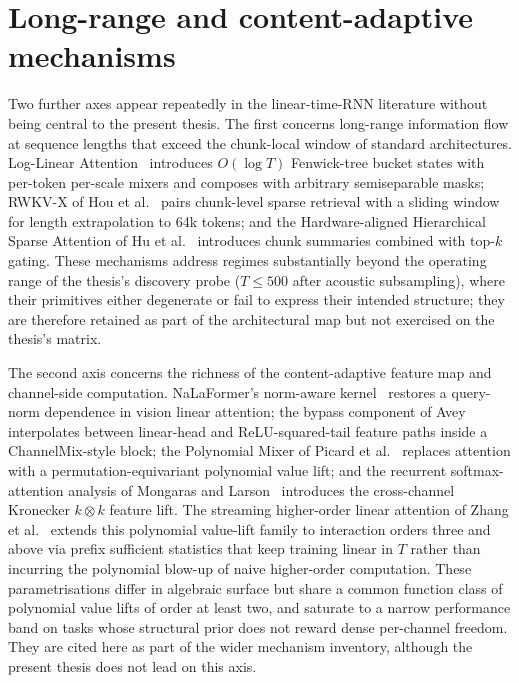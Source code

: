   \section{Long-range and content-adaptive mechanisms}

  Two further axes appear repeatedly in the linear-time-RNN
  literature without being central to the present thesis. The first
  concerns long-range information flow at sequence lengths that
  exceed the chunk-local window of standard architectures.
  Log-Linear Attention~\cite{guo2025loglinear} introduces
  $O(\log T)$ Fenwick-tree bucket states with per-token per-scale
  mixers and composes with arbitrary semiseparable masks; RWKV-X of
  Hou et al.~\cite{hou2025rwkvx} pairs chunk-level sparse retrieval
  with a sliding window for length extrapolation to 64k tokens; and
  the Hardware-aligned Hierarchical Sparse Attention of Hu et
  al.~\cite{hu2025hsa} introduces chunk summaries combined with
  top-$k$ gating. These mechanisms address regimes substantially
  beyond the operating range of the thesis's discovery probe
  ($T \le 500$ after acoustic subsampling), where their primitives
  either degenerate or fail to express their intended structure;
  they are therefore retained as part of the architectural map but
  not exercised on the thesis's matrix.

  The second axis concerns the richness of the content-adaptive
  feature map and channel-side computation. NaLaFormer's
  norm-aware kernel~\cite{meng2025normdirection} restores a
  query-norm dependence in vision linear attention; the bypass
  component of Avey~\cite{hammoud2025dont} interpolates between
  linear-head and ReLU-squared-tail feature paths inside a
  ChannelMix-style block; the Polynomial Mixer of Picard et
  al.~\cite{picard2026pom} replaces attention with a
  permutation-equivariant polynomial value lift; and the recurrent
  softmax-attention analysis of Mongaras and
  Larson~\cite{mongaras2025expressiveness} introduces the
  cross-channel Kronecker $k \otimes k$ feature lift. The
  streaming higher-order linear attention of Zhang et
  al.~\cite{zhang2025hla} extends this polynomial value-lift
  family to interaction orders three and above via prefix
  sufficient statistics that keep training linear in $T$ rather
  than incurring the polynomial blow-up of naive higher-order
  computation. These parametrisations differ in algebraic surface
  but share a common function class of polynomial value lifts of
  order at least two, and saturate to a narrow performance band on
  tasks whose structural prior does not reward dense per-channel
  freedom. They are cited here as part of the wider mechanism
  inventory, although the present thesis does not lead on this
  axis.

